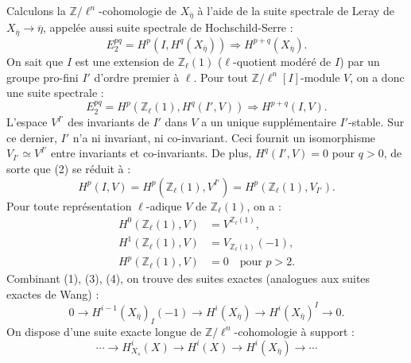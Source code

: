 \documentclass[12pt,a4paper]{article}
\theoremstyle{plain}
\theoremstyle{definition}
\theoremstyle{remark}
\newcommand{\ZZ}{{\mathbb{Z}}}
\begin{document}
Calculons la $\ZZ/\ell^n$-cohomologie de $X_{\overline{\eta}}$ \`a l'aide de la suite spectrale de Leray de $X_{\overline{\eta}} \to \overline{\eta}$, appel\'ee aussi suite spectrale de Hochschild-Serre :
\begin{equation}\label{eq:3.6.1.1}
E_2^{pq} = H^p(I, H^q(X_{\overline{\eta}})) \Rightarrow H^{p+q}(X_{\overline{\eta}}).
\end{equation}
On sait que $I$ est une extension de $\ZZ_\ell(1)$ ($\ell$-quotient mod\'er\'e de $I$) par un groupe pro-fini $I'$ d'ordre premier \`a $\ell$. Pour tout $\ZZ/\ell^n[I]$-module $V$, on a donc une suite spectrale :
\begin{equation}\label{eq:3.6.1.2}
E_2^{pq} = H^p(\ZZ_\ell(1), H^q(I', V)) \Rightarrow H^{p+q}(I, V).
\end{equation}
L'espace $V^{I'}$ des invariants de $I'$ dans $V$ a un unique suppl\'ementaire $I'$-stable. Sur ce dernier, $I'$ n'a ni invariant, ni co-invariant. Ceci fournit un isomorphisme $V_{I'} \simeq V^{I'}$ entre invariants et co-invariants. De plus, $H^q(I', V) = 0$ pour $q > 0$, de sorte que (2) se r\'eduit \`a :
\begin{equation}\label{eq:3.6.1.3}
H^p(I, V) = H^p(\ZZ_\ell(1), V^{I'}) = H^p(\ZZ_\ell(1), V_{I'}).
\end{equation}
Pour toute repr\'esentation $\ell$-adique $V$ de $\ZZ_\ell(1)$, on a :
\begin{equation}\label{eq:3.6.1.4}
\begin{aligned}
H^0(\ZZ_\ell(1), V) &= V^{\ZZ_\ell(1)}, \\
H^1(\ZZ_\ell(1), V) &= V_{\ZZ_\ell(1)}(-1), \\
H^p(\ZZ_\ell(1), V) &= 0 \quad \text{pour } p > 2.
\end{aligned}
\end{equation}
Combinant (1), (3), (4), on trouve des suites exactes (analogues aux suites exactes de Wang) :
\begin{equation}\label{eq:3.6.1.5}
0 \to H^{i-1}(X_{\overline{\eta}})_I(-1) \to H^i(X_{\overline{\eta}}) \to H^i(X_{\overline{\eta}})^I \to 0.
\end{equation}
On dispose d'une suite exacte longue de $\ZZ/\ell^n$-cohomologie \`a support :
\begin{equation}\label{eq:3.6.1.6}
\cdots \to H_{X_s}^i(X) \to H^i(X) \to H^i(X_{\overline{\eta}}) \to \cdots
\end{equation}
\end{document}
